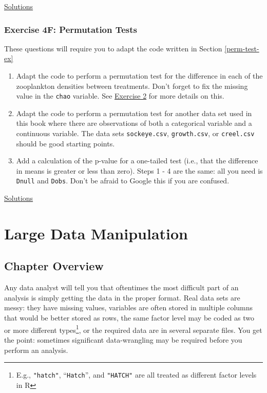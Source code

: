 \documentclass[]{book}
\providecommand{\tightlist}{%
  \setlength{\itemsep}{0pt}\setlength{\parskip}{0pt}}
\let\rmarkdownfootnote\footnote%
\def\footnote{\protect\rmarkdownfootnote}
\begin{document}
\protect\hyperlink{ex4e-answers}{Solutions}

\hypertarget{exercise-4f-permutation-tests}{%
\subsection*{Exercise 4F: Permutation Tests}\label{exercise-4f-permutation-tests}}

These questions will require you to adapt the code written in Section \ref{perm-test-ex}

\begin{enumerate}
\def\labelenumi{\arabic{enumi}.}
\tightlist
\item
  Adapt the code to perform a permutation test for the difference in each of the zooplankton densities between treatments. Don't forget to fix the missing value in the \texttt{chao} variable. See \protect\hyperlink{ex1b}{Exercise 2} for more details on this.
\item
  Adapt the code to perform a permutation test for another data set used in this book where there are observations of both a categorical variable and a continuous variable. The data sets \texttt{sockeye.csv}, \texttt{growth.csv}, or \texttt{creel.csv} should be good starting points.
\item
  Add a calculation of the p-value for a one-tailed test (i.e., that the difference in means is greater or less than zero). Steps 1 - 4 are the same: all you need is \texttt{Dnull} and \texttt{Dobs}. Don't be afraid to Google this if you are confused.
\end{enumerate}

\protect\hyperlink{ex4f-answers}{Solutions}

\hypertarget{ch5}{%
\chapter{Large Data Manipulation}\label{ch5}}

\hypertarget{chapter-overview-4}{%
\section*{Chapter Overview}\label{chapter-overview-4}}

Any data analyst will tell you that oftentimes the most difficult part of an analysis is simply getting the data in the proper format. Real data sets are messy: they have missing values, variables are often stored in multiple columns that would be better stored as rows, the same factor level may be coded as two or more different types\footnote{E.g., \texttt{"hatch"}, ``\texttt{Hatch}'', and \texttt{"HATCH"} are all treated as different factor levels in R}, or the required data are in several separate files. You get the point: sometimes significant data-wrangling may be required before you perform an analysis.
\end{document}
